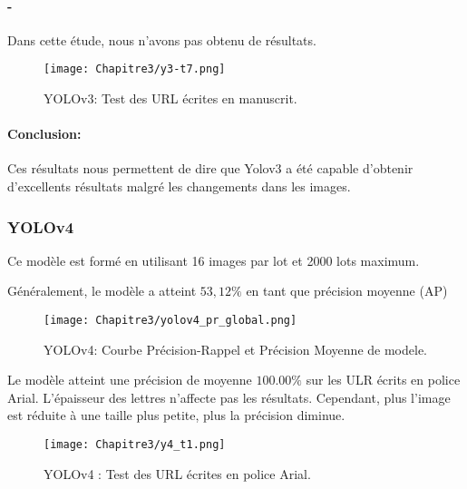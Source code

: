            \paragraph{-} Dans cette étude, nous n'avons pas obtenu de résultats.

           \begin{figure}[H]
               \centering
                \texttt{[image: Chapitre3/y3-t7.png]}
                \caption{YOLOv3: Test des URL écrites en manuscrit.}
                \label{y3_t7}
                \end{figure}

          \paragraph{Conclusion:} Ces résultats nous permettent de dire que Yolov3 a été capable d'obtenir d'excellents résultats malgré les changements dans les images.     

          \subsubsection{YOLOv4}
          Ce modèle est formé en utilisant 16 images par lot et 2000 lots maximum.

          Généralement, le modèle a atteint $53,12\%$ en tant que précision moyenne (AP)
          \begin{figure}[H]
                    \centering
                    \texttt{[image: Chapitre3/yolov4\_pr\_global.png]}
                    \caption{YOLOv4: Courbe Précision-Rappel et Précision Moyenne de modele.}
                    \label{y4_pr}
                    \end{figure}
               
          Le modèle atteint une précision de moyenne $100.00\%$ sur les ULR écrits en police Arial. L'épaisseur des lettres n'affecte pas les résultats. Cependant, plus l'image est réduite à une taille plus petite, plus la précision diminue.
          \begin{figure}[H]
                    \centering
                    \texttt{[image: Chapitre3/y4\_t1.png]}
                    \caption{YOLOv4 : Test des URL écrites en police Arial.}
                    \label{y4_t1}
                    \end{figure}
               
